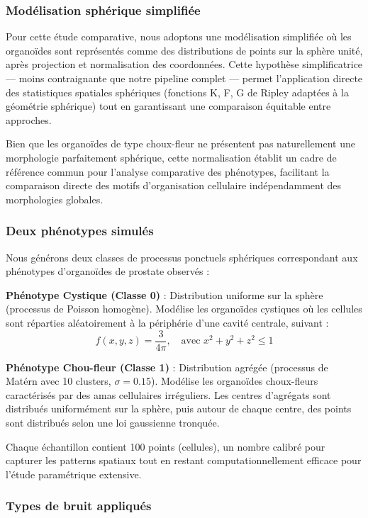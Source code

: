 \subsubsection{Modélisation sphérique simplifiée}

Pour cette étude comparative, nous adoptons une modélisation simplifiée où les organoïdes sont représentés comme des distributions de points sur la sphère unité, après projection et normalisation des coordonnées. Cette hypothèse simplificatrice — moins contraignante que notre pipeline complet — permet l'application directe des statistiques spatiales sphériques (fonctions K, F, G de Ripley adaptées à la géométrie sphérique) tout en garantissant une comparaison équitable entre approches.

Bien que les organoïdes de type choux-fleur ne présentent pas naturellement une morphologie parfaitement sphérique, cette normalisation établit un cadre de référence commun pour l'analyse comparative des phénotypes, facilitant la comparaison directe des motifs d'organisation cellulaire indépendamment des morphologies globales.

\subsubsection{Deux phénotypes simulés}

Nous générons deux classes de processus ponctuels sphériques correspondant aux phénotypes d'organoïdes de prostate observés :

\textbf{Phénotype Cystique (Classe 0)} : Distribution uniforme sur la sphère (processus de Poisson homogène). Modélise les organoïdes cystiques où les cellules sont réparties aléatoirement à la périphérie d'une cavité centrale, suivant :
\[
f(x,y,z) = \frac{3}{4\pi}, \quad \text{avec } x^2+y^2+z^2 \leq 1
\]

\textbf{Phénotype Chou-fleur (Classe 1)} : Distribution agrégée (processus de Matérn avec 10 clusters, $\sigma = 0.15$). Modélise les organoïdes choux-fleurs caractérisés par des amas cellulaires irréguliers. Les centres d'agrégats sont distribués uniformément sur la sphère, puis autour de chaque centre, des points sont distribués selon une loi gaussienne tronquée.

Chaque échantillon contient 100 points (cellules), un nombre calibré pour capturer les patterns spatiaux tout en restant computationnellement efficace pour l'étude paramétrique extensive.

\subsubsection{Types de bruit appliqués}


